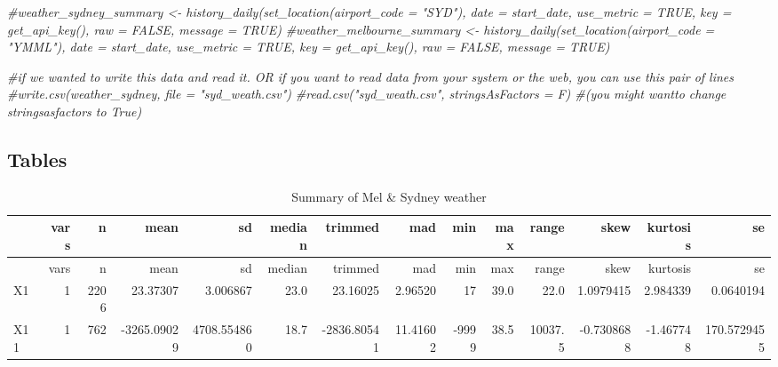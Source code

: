 \documentclass[]{article}
\newenvironment{Shaded}{\begin{snugshade}}{\end{snugshade}}
\newcommand{\CommentTok}[1]{\textcolor[rgb]{0.56,0.35,0.01}{\textit{#1}}}
\newcommand{\DataTypeTok}[1]{\textcolor[rgb]{0.13,0.29,0.53}{#1}}
\newcommand{\KeywordTok}[1]{\textcolor[rgb]{0.13,0.29,0.53}{\textbf{#1}}}
\newcommand{\NormalTok}[1]{#1}
\newcommand{\OperatorTok}[1]{\textcolor[rgb]{0.81,0.36,0.00}{\textbf{#1}}}
\newcommand{\StringTok}[1]{\textcolor[rgb]{0.31,0.60,0.02}{#1}}
\begin{document}
\begin{Shaded}
\begin{Highlighting}[]
\CommentTok{#weather_sydney_summary <- history_daily(set_location(airport_code = "SYD"), date = start_date, use_metric = TRUE, key = get_api_key(), raw = FALSE, message = TRUE)}
\CommentTok{#weather_melbourne_summary <- history_daily(set_location(airport_code = "YMML"), date = start_date, use_metric = TRUE, key = get_api_key(), raw = FALSE, message = TRUE)}

\CommentTok{#if we wanted to write this data and read it. OR if you want to read data from your system or the web, you can use this pair of lines}
\CommentTok{#write.csv(weather_sydney, file = "syd_weath.csv")}
\CommentTok{#read.csv("syd_weath.csv", stringsAsFactors = F) #(you might wantto change stringsasfactors to True)}
\end{Highlighting}
\end{Shaded}

\hypertarget{tables}{%
\subsection{Tables}\label{tables}}

\begin{Shaded}
\end{Shaded}

\begin{longtable}[]{@{}lrrrrrrrrrrrrr@{}}
\caption{Summary of Mel \& Sydney weather}\tabularnewline
\toprule
& vars & n & mean & sd & median & trimmed & mad & min & max & range &
skew & kurtosis & se\tabularnewline
\midrule
\endfirsthead
\toprule
& vars & n & mean & sd & median & trimmed & mad & min & max & range &
skew & kurtosis & se\tabularnewline
\midrule
\endhead
X1 & 1 & 2206 & 23.37307 & 3.006867 & 23.0 & 23.16025 & 2.96520 & 17 &
39.0 & 22.0 & 1.0979415 & 2.984339 & 0.0640194\tabularnewline
X11 & 1 & 762 & -3265.09029 & 4708.554860 & 18.7 & -2836.80541 &
11.41602 & -9999 & 38.5 & 10037.5 & -0.7308688 & -1.467748 &
170.5729455\tabularnewline
\bottomrule
\end{longtable}
\end{document}
